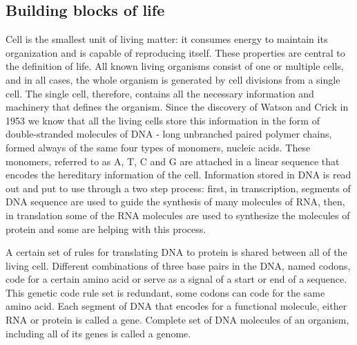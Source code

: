 \documentclass[11pt, a4paper,oneside]{report}
\begin{document}
\subsection{Building blocks of life}
Cell is the smallest unit of living matter: it consumes energy to maintain its organization and is capable of reproducing itself. These properties are central to the definition of life. All known living organisms consist of one or multiple cells, and in all cases, the whole organism is generated by cell divisions from a single cell. The single cell, therefore, contains all the necessary information and machinery that defines the organism.  Since the discovery of Watson and Crick in 1953\cite{Watson1974} we know that all the living cells store this information in the form of double-stranded molecules of DNA - long unbranched paired polymer chains, formed always of the same four types of monomers, nucleic acids. These monomers, referred to as A, T, C and G are attached  in a linear sequence that encodes the hereditary information of the cell. Information stored in DNA is read out and put to use through a two step process: first, in transcription, segments of DNA sequence are used to guide the synthesis of many molecules of RNA, then, in translation some of the RNA molecules are used to synthesize the molecules of protein and some are helping with this process\cite{britannica}.

 A certain set of rules for translating DNA to protein is shared between all of the living cell.  Different combinations of three base pairs in the DNA, named codons, code for a certain amino acid or serve as a signal of a start or end of a sequence.  This genetic code rule set is redundant, some codons can code for the same amino acid\cite{Turanov2009}. Each segment of DNA that encodes for a functional molecule, either RNA or protein is called a gene\cite{Gerstein2007}.  Complete set of DNA molecules of an organism, including all of its genes is called a genome.  
\end{document}
